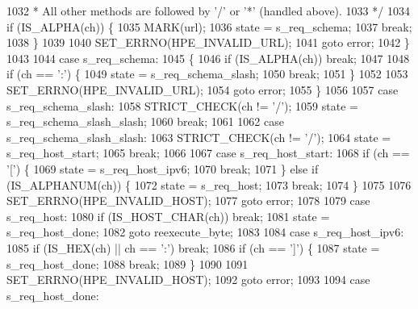 \begin{DoxyCode}
1032 \textcolor{comment}{         * All other methods are followed by '/' or '*' (handled above).}
1033 \textcolor{comment}{         */}
1034         \textcolor{keywordflow}{if} (IS_ALPHA(ch)) \{
1035           MARK(url);
1036           state = s_req_schema;
1037           \textcolor{keywordflow}{break};
1038         \}
1039 
1040         SET_ERRNO(HPE_INVALID_URL);
1041         \textcolor{keywordflow}{goto} error;
1042       \}
1043 
1044       \textcolor{keywordflow}{case} s_req_schema:
1045       \{
1046         \textcolor{keywordflow}{if} (IS_ALPHA(ch)) \textcolor{keywordflow}{break};
1047 
1048         \textcolor{keywordflow}{if} (ch == \textcolor{charliteral}{':'}) \{
1049           state = s_req_schema_slash;
1050           \textcolor{keywordflow}{break};
1051         \}
1052 
1053         SET_ERRNO(HPE_INVALID_URL);
1054         \textcolor{keywordflow}{goto} error;
1055       \}
1056 
1057       \textcolor{keywordflow}{case} s_req_schema_slash:
1058         STRICT_CHECK(ch != \textcolor{charliteral}{'/'});
1059         state = s_req_schema_slash_slash;
1060         \textcolor{keywordflow}{break};
1061 
1062       \textcolor{keywordflow}{case} s_req_schema_slash_slash:
1063         STRICT_CHECK(ch != \textcolor{charliteral}{'/'});
1064         state = s_req_host_start;
1065         \textcolor{keywordflow}{break};
1066 
1067       \textcolor{keywordflow}{case} s_req_host_start:
1068         \textcolor{keywordflow}{if} (ch == \textcolor{charliteral}{'['}) \{
1069           state = s_req_host_ipv6;
1070           \textcolor{keywordflow}{break};
1071         \} \textcolor{keywordflow}{else} \textcolor{keywordflow}{if} (IS_ALPHANUM(ch)) \{
1072           state = s_req_host;
1073           \textcolor{keywordflow}{break};
1074         \}
1075 
1076         SET_ERRNO(HPE_INVALID_HOST);
1077         \textcolor{keywordflow}{goto} error;
1078 
1079       \textcolor{keywordflow}{case} s_req_host:
1080         \textcolor{keywordflow}{if} (IS_HOST_CHAR(ch)) \textcolor{keywordflow}{break};
1081         state = s_req_host_done;
1082         \textcolor{keywordflow}{goto} reexecute\_byte;
1083 
1084       \textcolor{keywordflow}{case} s_req_host_ipv6:
1085         \textcolor{keywordflow}{if} (IS_HEX(ch) || ch == \textcolor{charliteral}{':'}) \textcolor{keywordflow}{break};
1086         \textcolor{keywordflow}{if} (ch == \textcolor{charliteral}{']'}) \{
1087           state = s_req_host_done;
1088           \textcolor{keywordflow}{break};
1089         \}
1090 
1091         SET_ERRNO(HPE_INVALID_HOST);
1092         \textcolor{keywordflow}{goto} error;
1093 
1094       \textcolor{keywordflow}{case} s_req_host_done:

\end{DoxyCode}
